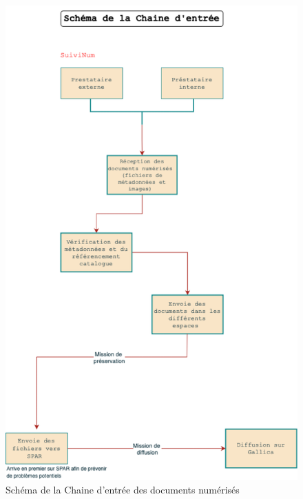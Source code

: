 \documentclass[a4paper,12pt,twoside]{book}
\begin{document}
\begin{figure}
	\centering
	\includegraphics[width=0.7\linewidth]{images/schem_num_bnf}
	\caption{Schéma de la Chaine d’entrée des documents numérisés }
	\label{fig:schemnumbnf}
\end{figure}




\newpage{\pagestyle{empty}\cleardoublepage}


\backmatter %

\tableofcontents
\end{document}
